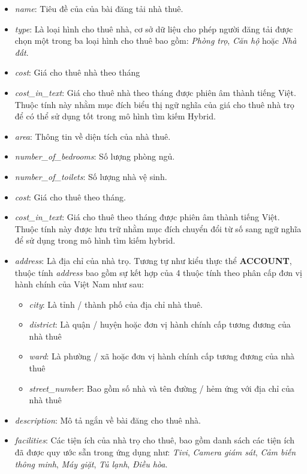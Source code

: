 \begin{itemize}
    \begin{itemize}
        \item \textit{name}: Tiêu đề của của bài đăng tải nhà thuê.
        \item \textit{type}: Là loại hình cho thuê nhà, cơ sở dữ liệu cho phép người đăng tải được chọn một trong ba loại hình cho thuê bao gồm: \textit{Phòng trọ}, \textit{Căn hộ} hoặc \textit{Nhà đất}.
        \item \textit{cost}: Giá cho thuê nhà theo tháng
        \item \textit{cost\_in\_text}: Giá cho thuê nhà theo tháng được phiên âm thành tiếng Việt. Thuộc tính này nhằm mục đích biểu thị ngữ nghĩa của giá cho thuê nhà trọ để có thể sử dụng tốt trong mô hình tìm kiếm Hybrid.
        \item \textit{area}: Thông tin về diện tích của nhà thuê.
        \item \textit{number\_of\_bedrooms}: Số lượng phòng ngủ.
        \item \textit{number\_of\_toilets}: Số lượng nhà vệ sinh.
        \item \textit{cost}: Giá cho thuê theo tháng.
        \item \textit{cost\_in\_text}: Giá cho thuê theo tháng được phiên âm thành tiếng Việt. Thuộc tính này được lưu trữ nhằm mục đích chuyển đổi từ số sang ngữ nghĩa để sử dụng trong mô hình tìm kiếm hybrid.
        \item \textit{address}: Là địa chỉ của nhà trọ. Tương tự như kiểu thực thể \textbf{ACCOUNT}, thuộc tính \textit{address} bao gồm sự kết hợp của 4 thuộc tính theo phân cấp đơn vị hành chính của Việt Nam như sau:
        \begin{itemize}
            \item \textit{city}: Là tỉnh / thành phố của địa chỉ nhà thuê.
            \item \textit{district}: Là quận / huyện hoặc đơn vị hành chính cấp tương đương của nhà thuê
            \item \textit{ward}: Là phường / xã hoặc đơn vị hành chính cấp tương đương của nhà thuê
            \item \textit{street\_number}: Bao gồm số nhà và tên đường / hẻm ứng với địa chỉ của nhà thuê
        \end{itemize}
        \item \textit{description}: Mô tả ngắn về bài đăng cho thuê nhà.
        \item \textit{facilities}: Các tiện ích của nhà trọ cho thuê, bao gồm danh sách các tiện ích đã được quy ước sẵn trong ứng dụng như: \textit{Tivi}, \textit{Camera giám sát}, \textit{Cảm biến thông minh}, \textit{Máy giặt}, \textit{Tủ lạnh}, \textit{Điều hòa}.

\end{itemize}
\end{itemize}
